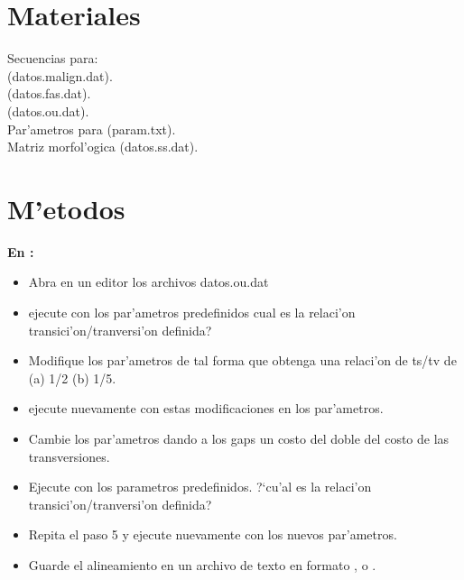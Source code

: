 \section{Materiales}
\noindent
Secuencias para:\\
 (datos.malign.dat).\\
 (datos.fas.dat).\\
 (datos.ou.dat).\\
Par'ametros para  (param.txt).\\
Matriz morfol'ogica (datos.ss.dat).
\section{M'etodos}
\noindent
\textbf{En :}\\
\noindent
\begin{itemize}
\item Abra en un editor los archivos datos.ou.dat
\item   ejecute  con los par'ametros predefinidos cual es la relaci'on transici'on/tranversi'on definida?
\item   Modifique los par'ametros de tal forma que obtenga una relaci'on de ts/tv de (a) 1/2 (b) 1/5.
\item   ejecute nuevamente  con estas modificaciones en los par'ametros.
\item   Cambie los par'ametros dando a los gaps un costo del doble del costo de las transversiones.
\item  Ejecute  con los parametros predefinidos. ?`cu'al es la relaci'on transici'on/tranversi'on definida?
\item   Repita el paso 5 y ejecute nuevamente  con los nuevos par'ametros.
\item    Guarde el alineamiento en un archivo de texto en formato ,  o .
\end{itemize}


